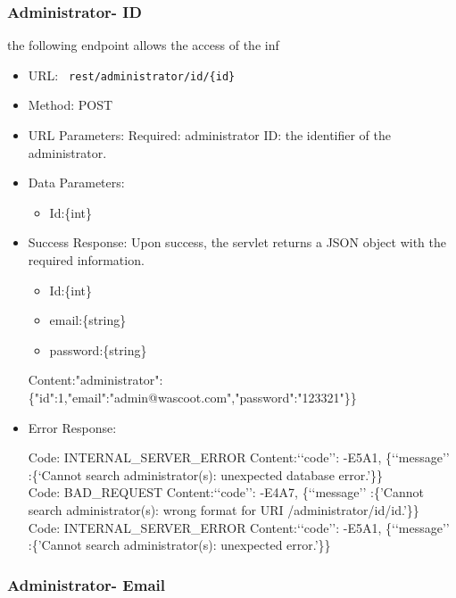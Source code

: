 \subsubsection*{ Administrator- ID }
the following endpoint allows the access of the inf 
\begin{itemize}
    \item URL: \texttt{ rest/administrator/id/\{id\}}
    \item Method: POST
    \item URL Parameters: Required: administrator ID: the identifier of the administrator.
    \item Data Parameters: 
    \begin{itemize}
       \item  Id:\{int\}
    \end{itemize}
    \item Success Response: Upon success, the servlet returns a JSON object with the required information.
        \begin{itemize}
       \item  Id:\{int\}
       \item  email:\{string\}
       \item  password:\{string\}
    \end{itemize}

    Content:"administrator":\{"id":1,"email":"admin@wascoot.com","password":"123321"\}\}
    \item Error Response: 
     
Code: INTERNAL\_SERVER\_ERROR \newline
Content:‘‘code’’: -E5A1, \{‘‘message’’ :\{‘Cannot search administrator(s): unexpected database error.'\}\}
\\
Code: BAD\_REQUEST\newline
Content:‘‘code’’: -E4A7, \{‘‘message’’ :\{'Cannot search administrator(s): wrong format for URI /administrator/id/{id}.'\}\}
\\
Code: INTERNAL\_SERVER\_ERROR\newline
Content:‘‘code’’: -E5A1, \{‘‘message’’ :\{'Cannot search administrator(s): unexpected error.'\}\}
    
\end{itemize}

\subsubsection*{ Administrator- Email }

